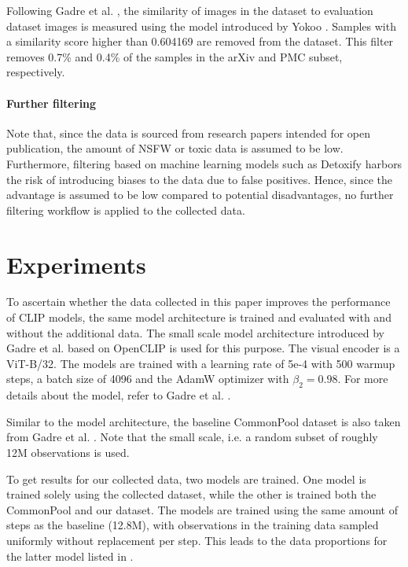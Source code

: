 Following Gadre et al. \cite{DBLP:journals/corr/abs-2304-14108}, the similarity of images in the dataset to evaluation dataset images is measured using the model introduced by Yokoo \cite{DBLP:journals/corr/abs-2112-04323}. Samples with a similarity score higher than 0.604169 are removed from the dataset. This filter removes 0.7\% and 0.4\% of the samples in the arXiv and PMC subset, respectively.

\paragraph{Further filtering}

Note that, since the data is sourced from research papers intended for open publication, the amount of NSFW or toxic data is assumed to be low. Furthermore, filtering based on machine learning models such as Detoxify \cite{Detoxify} harbors the risk of introducing biases to the data due to false positives. Hence, since the advantage is assumed to be low compared to potential disadvantages, no further filtering workflow is applied to the collected data.

\section{Experiments}

To ascertain whether the data collected in this paper improves the performance of CLIP models, the same model architecture is trained and evaluated with and without the additional data. The small scale model architecture introduced by Gadre et al. \cite{DBLP:journals/corr/abs-2304-14108} based on OpenCLIP is used for this purpose. The visual encoder is a ViT-B/32. The models are trained with a learning rate of 5e-4 with 500 warmup steps, a batch size of 4096 and the AdamW optimizer with $\beta_2 =0.98$. For more details about the model, refer to Gadre et al. \cite{DBLP:journals/corr/abs-2304-14108}.

Similar to the model architecture, the baseline CommonPool dataset is also taken from Gadre et al. \cite{DBLP:journals/corr/abs-2304-14108}. Note that the small scale, i.e. a random subset of roughly 12M observations is used.

To get results for our collected data, two models are trained. One model is trained solely using the collected dataset, while the other is trained both the CommonPool and our dataset. The models are trained using the same amount of steps as the baseline (12.8M), with observations in the training data sampled uniformly without replacement per step. This leads to the data proportions for the latter model listed in .

